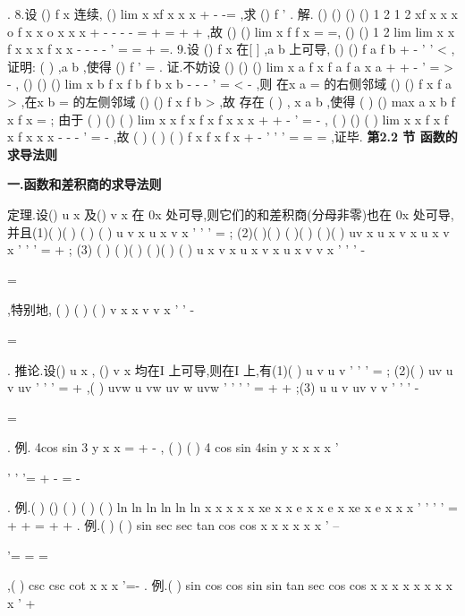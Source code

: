 . 
8.设
()
f x 连续,
()
lim
x
xf x
x
x
\to 
+
-
-=
,求
()
f '
. 
解.
()
()
()
()
1 2
1 2
xf x
x
x
o
f x
x
o x
x
x
+
-
-
-
-
=
+
\Rightarrow 
=
+
+
,故 
()
()
lim
x
f
f x
\to 
=
=,
()
()
1 2
lim
lim
x
x
f x
x
x
f
x
x
\to 
\to 
-
-
-
-
'
=
=
+
=. 
9.设
()
f x 在[
]
,a b 上可导,
()
()
f
a
f
b
+
-
'
'
\cdots 
<
,证明:
(
)
,a b
\psi 
\exists \in 
,使得
()
f
\psi 
'
=
. 
证.不妨设
()
()
()
lim
x
a
f x
f a
f
a
x
a
+
+
\to 
-
'
=
>
-
,
()
()
()
lim
x
b
f x
f b
f
b
x
b
-
-
\to 
-
'
=
<
-
,则 
在x
a
=
的右侧邻域
()
()
f x
f a
>
,在x
b
=
的左侧邻域
()
()
f x
f b
>
,故 
存在
(
)
,
x
a b
\in 
,使得
(
)
()
max
a x b
f x
f x
\le \le 
=
; 
由于
(
)
()
(
)
lim
x
x
f x
f x
f
x
x
x
+
+
\to 
-
'
=
\le 
-
,
(
)
()
(
)
lim
x
x
f x
f x
f
x
x
x
-
-
\to 
-
'
=
\ge 
-
,故 
(
)
(
)
(
)
f
x
f
x
f
x
+
-
'
'
'
=
=
=
,证毕. 
\vspace{6pt}
{\large \bfseries \textcolor{lyred}{第2.2 节 函数的求导法则}}

\vspace{4pt}
{\bfseries \textcolor{lyred}{一.函数和差积商的求导法则}}

\textcolor{lyred}{定理}.设()
u x 及()
v x 在
0x 处可导,则它们的和差积商(分母非零)也在
0x 处可导, 
并且(1)(
)(
)
(
)
(
)
u
v
x
u
x
v x
'
'
'
\pm 
=
\pm 
; 
(2)(
)(
)
(
)(
)
(
)(
)
uv
x
u
x
v x
u x
v x
'
'
'
=
+
; 
(3)
(
)
(
)(
)
(
)(
)
(
)
u
x
v x
u x
v x
u
x
v
v
x
'
'
'
-


=




,特别地,
(
)
(
)
(
)
v x
x
v
v
x
'
'
-


=




. 
\textcolor{lyred}{推论}.设()
u x , ()
v x 均在I 上可导,则在I 上,有(1)(
)
u
v
u
v
\alpha 
\beta 
\alpha 
\beta 
'
'
'
\pm 
=
\pm 
; 
(2)(
)
uv
u v
uv
'
'
'
=
+
,(
)
uvw
u vw
uv w
uvw
'
'
'
'
=
+
+
;(3)
u
u v
uv
v
v
'
'
'
-

=




. 
\textcolor{lyred}{例}.
4cos
sin 3
y
x
x
\pi 
=
+
-
,
(
)
(
)
4 cos
sin
4sin
y
x
x
x
x
\pi '


'
'
'=
+
-
=
-




. 
\textcolor{lyred}{例}.(
)
()
(
)
(
)
(
)
ln
ln
ln
ln
ln
ln
x
x
x
x
x
xe
x
x
e
x
x e
x
xe
x
e
x
x
x
'
'
'
'
=
+
+
=
+
+
. 
\textcolor{lyred}{例}.(
)
(
)
sin
sec
sec tan
cos
cos
x
x
x
x
x
x
'
--


'=
=
=




,(
)
csc
csc cot
x
x
x
'=-
. 
\textcolor{lyred}{例}.(
)
sin
cos
cos
sin
sin
tan
sec
cos
cos
x
x
x
x
x
x
x
x
x
'
\cdots 
+
\cdots 


